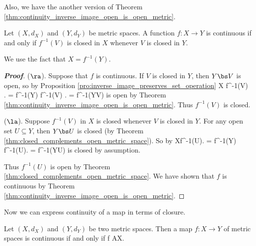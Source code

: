 Also, we have the another version of Theorem \ref{thm:continuity_inverse_image_open_is_open_metric}.%

\begin{corollary}\label{cor:continuity_inverse_image_closed_is_closed}%
Let $(X,d_X)$ and $(Y,d_Y)$ be metric spaces. A function $f:X\to Y$ is continuous if and only if $f^{-1}(V)$ is closed in $X$ whenever $V$ is closed in $Y$.
\end{corollary}

\begin{remark}
We use the fact that $X = f^{-1}(Y)$.
\end{remark}

\begin{proof}[\bf Proof]
($\ra$). Suppose that $f$ is continuous. If $V$ is closed in $Y$, then $Y\bs V$ is open, so by Proposition \ref{pro:inverse_image_preserves_set_operation}
\be
X \left\bs f^{-1}(V) \right. = f^{-1}(Y) \left\bs f^{-1}(V) \right. = f^{-1}(Y\bs V)
\ee
is open by Theorem \ref{thm:continuity_inverse_image_open_is_open_metric}. Thus $f^{-1}(V)$ is closed.

($\la$). Suppose $f^{-1}(V)$ in $X$ is closed whenever $V$ is closed in $Y$. For any open set $U \subseteq Y$, then $Y\bs U$ is closed (by Theorem \ref{thm:closed_complements_open_metric_space}). So by
\be
X\left\bs f^{-1}(U)\right. = f^{-1}(Y) \left\bs f^{-1}(U)\right. = f^{-1}(Y\bs U)
\ee
is closed by assumption.

Thus $f^{-1}(U)$ is open by Theorem \ref{thm:closed_complements_open_metric_space}. We have shown that $f$ is continuous by Theorem \ref{thm:continuity_inverse_image_open_is_open_metric}.
\end{proof}


Now we can express continuity of a map in terms of closure.

\begin{theorem}\label{thm:continuous_closure_relation}
Let $(X,d_X)$ and $(Y,d_Y)$ be two metric spaces. Then a map $f:X\to Y$ of metric spaces is continuous if and only if
\be
f \subseteq {} \quad {}A\subseteq X.
\ee
\end{theorem}

